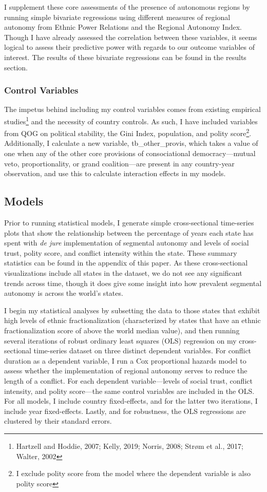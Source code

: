 \documentclass[12pt]{article}
\begin{document}
\doublespacing
I supplement these core assessments of the presence of autonomous regions by running simple bivariate regressions using different measures of regional autonomy from Ethnic Power Relations and the Regional Autonomy Index. Though I have already assessed the correlation between these variables, it seems logical to assess their predictive power with regards to our outcome variables of interest. The results of these bivariate regressions can be found in the results section. 

\subsubsection{Control Variables} 
The impetus behind including my control variables comes from existing empirical studies\footnote{Hartzell and Hoddie, 2007; Kelly, 2019; Norris, 2008; Strøm et al., 2017; Walter, 2002} and the necessity of country controls. As such, I have included variables from QOG on political stability, the Gini Index, population, and polity score\footnote{I exclude polity score from the model where the dependent variable is also polity score}. Additionally, I calculate a new variable, tb\_other\_provis, which takes a value of one when any of the other core provisions of consociational democracy---mutual veto, proportionality, or grand coalition---are present in any country-year observation, and use this to calculate interaction effects in my models. 

\subsection{Models}
Prior to running statistical models, I generate simple cross-sectional time-series plots that show the relationship between the percentage of years each state has spent with \textit{de jure} implementation of segmental autonomy and levels of social trust, polity score, and conflict intensity within the state. These summary statistics can be found in the appendix of this paper. As these cross-sectional visualizations include all states in the dataset, we do not see any significant trends across time, though it does give some insight into how prevalent segmental autonomy is across the world's states. 

I begin my statistical analyses by subsetting the data to those states that exhibit high levels of ethnic fractionalization (characterized by states that have an ethnic fractionalization score of above the world median value), and then running several iterations of robust ordinary least squares (OLS) regression on my cross-sectional time-series dataset on three distinct dependent variables. For conflict duration as a dependent variable, I run a Cox proportional hazards model to assess whether the implementation of regional autonomy serves to reduce the length of a conflict. For each dependent variable---levels of social trust, conflict intensity, and polity score---the same control variables are included in the OLS. For all models, I include country fixed-effects, and for the latter two iterations, I include year fixed-effects. Lastly, and for robustness, the OLS regressions are clustered by their standard errors.  
\end{document}
